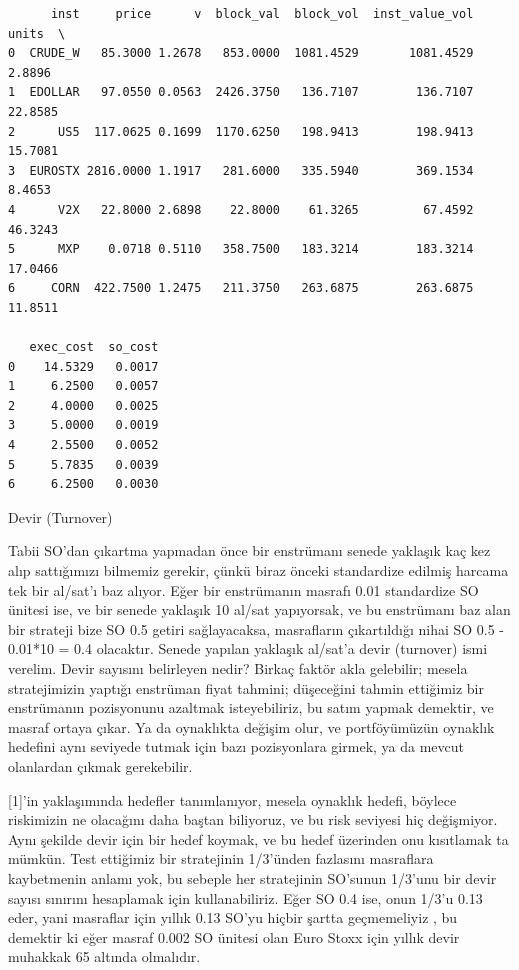 \documentclass[12pt,fleqn]{article}\usepackage{../../common}
\begin{document}
\begin{verbatim}
      inst     price      v  block_val  block_vol  inst_value_vol   units  \
0  CRUDE_W   85.3000 1.2678   853.0000  1081.4529       1081.4529  2.8896   
1  EDOLLAR   97.0550 0.0563  2426.3750   136.7107        136.7107 22.8585   
2      US5  117.0625 0.1699  1170.6250   198.9413        198.9413 15.7081   
3  EUROSTX 2816.0000 1.1917   281.6000   335.5940        369.1534  8.4653   
4      V2X   22.8000 2.6898    22.8000    61.3265         67.4592 46.3243   
5      MXP    0.0718 0.5110   358.7500   183.3214        183.3214 17.0466   
6     CORN  422.7500 1.2475   211.3750   263.6875        263.6875 11.8511   

   exec_cost  so_cost  
0    14.5329   0.0017  
1     6.2500   0.0057  
2     4.0000   0.0025  
3     5.0000   0.0019  
4     2.5500   0.0052  
5     5.7835   0.0039  
6     6.2500   0.0030  
\end{verbatim}

Devir (Turnover)

Tabii SO'dan çıkartma yapmadan önce bir enstrümanı senede yaklaşık kaç kez alıp
sattığımızı bilmemiz gerekir, çünkü biraz önceki standardize edilmiş harcama tek
bir al/sat'ı baz alıyor. Eğer bir enstrümanın masrafı 0.01 standardize SO
ünitesi ise, ve bir senede yaklaşık 10 al/sat yapıyorsak, ve bu enstrümanı baz
alan bir strateji bize SO 0.5 getiri sağlayacaksa, masrafların çıkartıldığı
nihai SO 0.5 - 0.01*10 = 0.4 olacaktır. Senede yapılan yaklaşık al/sat'a devir
(turnover) ismi verelim. Devir sayısını belirleyen nedir? Birkaç faktör akla
gelebilir; mesela stratejimizin yaptığı enstrüman fiyat tahmini; düşeceğini
tahmin ettiğimiz bir enstrümanın pozisyonunu azaltmak isteyebiliriz, bu satım
yapmak demektir, ve masraf ortaya çıkar. Ya da oynaklıkta değişim olur, ve
portföyümüzün oynaklık hedefini aynı seviyede tutmak için bazı pozisyonlara
girmek, ya da mevcut olanlardan çıkmak gerekebilir.

[1]'in yaklaşımında hedefler tanımlanıyor, mesela oynaklık hedefi, böylece
riskimizin ne olacağını daha baştan biliyoruz, ve bu risk seviyesi hiç
değişmiyor. Aynı şekilde devir için bir hedef koymak, ve bu hedef üzerinden onu
kısıtlamak ta mümkün. Test ettiğimiz bir stratejinin 1/3'ünden fazlasını
masraflara kaybetmenin anlamı yok, bu sebeple her stratejinin SO'sunun 1/3'unu
bir devir sayısı sınırını hesaplamak için kullanabiliriz. Eğer SO 0.4 ise, onun
1/3'u 0.13 eder, yani masraflar için yıllık 0.13 SO'yu hiçbir şartta
geçmemeliyiz , bu demektir ki eğer masraf 0.002 SO ünitesi olan Euro Stoxx için
yıllık devir muhakkak 65 altında olmalıdır.
\end{document}
